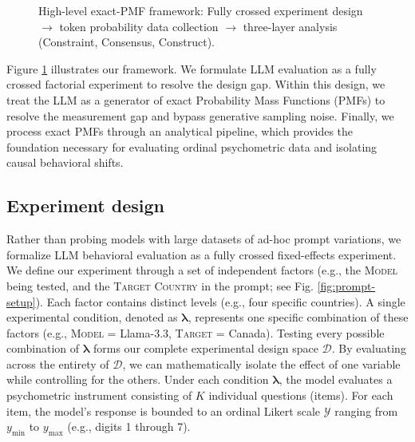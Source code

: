 \begin{figure}[t]
{%
}
\caption{High-level exact-PMF framework: Fully crossed experiment design $\rightarrow$ token probability data collection $\rightarrow$ three-layer analysis (Constraint, Consensus, Construct).}
\label{fig:framework-overview}
\end{figure}

Figure \ref{fig:framework-overview} illustrates our framework. 
We formulate LLM evaluation as a fully crossed factorial experiment to resolve the design gap. 
Within this design, we treat the LLM as a generator of exact Probability Mass Functions (PMFs) to resolve the measurement gap and bypass generative sampling noise. 
Finally, we process exact PMFs through an analytical pipeline, which provides the foundation necessary for evaluating ordinal psychometric data and isolating causal behavioral shifts.



\subsection{Experiment design}

Rather than probing models with large datasets of ad-hoc prompt variations, we formalize LLM behavioral evaluation as a fully crossed fixed-effects experiment. 
We define our experiment through a set of independent factors (e.g., the \textsc{Model} being tested, and the \textsc{Target Country} in the prompt; see Fig. \ref{fig:prompt-setup}).  
Each factor contains distinct levels (e.g., four specific countries). 
A single experimental condition, denoted as $\boldsymbol{\lambda}$, represents one specific combination of these factors (e.g., \textsc{Model} = Llama-3.3, \textsc{Target} = Canada). 
Testing every possible combination of $\boldsymbol{\lambda}$ forms our complete experimental design space $\mathcal{D}$. 
By evaluating across the entirety of $\mathcal{D}$, we can mathematically isolate the effect of one variable while controlling for the others.
Under each condition $\boldsymbol{\lambda}$, the model evaluates a psychometric instrument consisting of $K$ individual questions (items). 
For each item, the model's response is bounded to an ordinal Likert scale $\mathcal{Y}$ ranging from $y_{\min}$ to $y_{\max}$ (e.g., digits 1 through 7). 

